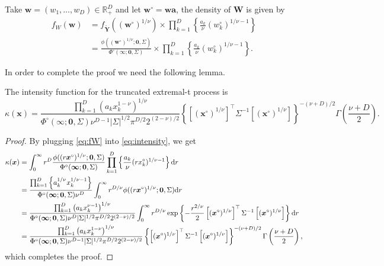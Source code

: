 \documentclass[12pt]{article}
\begin{document}
Take $\bm w = (w_1, \ldots, w_D) \in \mathbb{R}^D_+$ and let $\bm w^\circ = \bm w \bm a$, the density of $\bm W$ is given by
%
\begin{align}
\label{eq:fW}
f_W(\bm w) &= f_{\tilde{\bm Y}} \left( \left( \bm w^\circ \right)^{1/\nu} \right) \times \prod_{k=1}^D \left\{ \frac{a_k}{\nu} \left(w_k^\circ \right)^{1/\nu-1} \right\} \nonumber \\
&= \frac{\phi\left( \left( \bm w^\circ \right)^{1/\nu} ;\bm 0, \Sigma \right)} {\Phi^\circ(\bm \infty;\bm 0, \Sigma)} 
\times \prod_{k=1}^D \left\{ \frac{a_k}{\nu} \left(w_k^\circ\right)^{1/\nu-1} \right\}.
\end{align}
%

In order to complete the proof we need the following lemma.

\begin{lemma}
\label{lem:kappEt}
The intensity function for the truncated extremal-t process is
%
\begin{equation*}
\kappa(\bm x) = \frac{\prod_{k=1}^D \left(a_k x_k^{1-\nu}\right)^{1/\nu}}{\Phi^\circ(\bm \infty;\bm 0, \Sigma) \nu^{D-1}|\Sigma|^{1/2}\pi^{D/2}2^{(2-\nu)/2}} \left\{\left[(\bm x^\circ)^{1/\nu}\right]^\top \Sigma^{-1}\left[(\bm x^\circ)^{1/\nu}\right]\right\}^{-(\nu+D)/2} \Gamma\left(\frac{\nu+D}{2}\right).
\end{equation*}
\end{lemma}

\begin{proof}

By plugging \eqref{eq:fW} into \eqref{eq:intensity}, we get 
%
\begin{align*}
\kappa(\bm x) &= \int_0^\infty r^D \frac{\phi( (r \bm x^\circ)^{1/\nu};\bm 0, \Sigma)}{\Phi^\circ(\bm \infty;\bm 0, \Sigma)} \prod_{k=1}^D \left\{ \frac{a_k}{\nu} (r x_k^\circ)^{1/\nu-1}\right\}\text d r	\\
&= \frac{\prod_{k=1}^D \left\{a_k^{1/\nu} x_k^{1/\nu-1}\right\}}{\Phi^\circ(\bm \infty;\bm 0, \Sigma)\nu^D}\int_0^\infty r^{D/\nu} \phi( (r\bm x^\circ)^{1/\nu};\bm 0, \Sigma) \text d r\\
&= \frac{\prod_{k=1}^D \left(a_k x_k^{\nu-1}\right)^{1/\nu}}{\Phi^\circ(\bm \infty;\bm 0, \Sigma) \nu^D |\Sigma|^{1/2} \pi^{D/2}2^{(2-\nu)/2}} \int_0^\infty r^{D/\nu} \exp \left\{-\frac{r^{2/\nu}}{2} \left[(\bm x^\circ)^{1/\nu}\right]^\top\Sigma^{-1}\left[(\bm x^\circ)^{1/\nu}\right]\right\} \text dr\\
&= \frac{\prod_{k=1}^D \left(a_k x_k^{1-\nu}\right)^{1/\nu}}{\Phi^\circ(\bm \infty;\bm 0, \Sigma) \nu^{D-1}|\Sigma|^{1/2}\pi^{D/2}2^{(2-\nu)/2}} \left\{\left[(\bm x^\circ)^{1/\nu}\right]^\top \Sigma^{-1}\left[(\bm x^\circ)^{1/\nu}\right]\right\}^{-(\nu+D)/2} \Gamma\left(\frac{\nu+D}{2}\right),
\label{eq:truncated_extremal_t_intensity}
\end{align*}
%
which completes the proof.
%
\end{proof}
\end{document}
